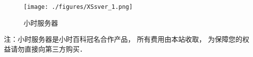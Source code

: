
\begin{figure}[ht]
\centering
\texttt{[image: ./figures/XSsver\_1.png]}
\caption{小时服务器} \label{XSsver_fig1}
\end{figure}


注：小时服务器是小时百科冠名合作产品， 所有费用由本站收取， 为保障您的权益请勿直接向第三方购买．
